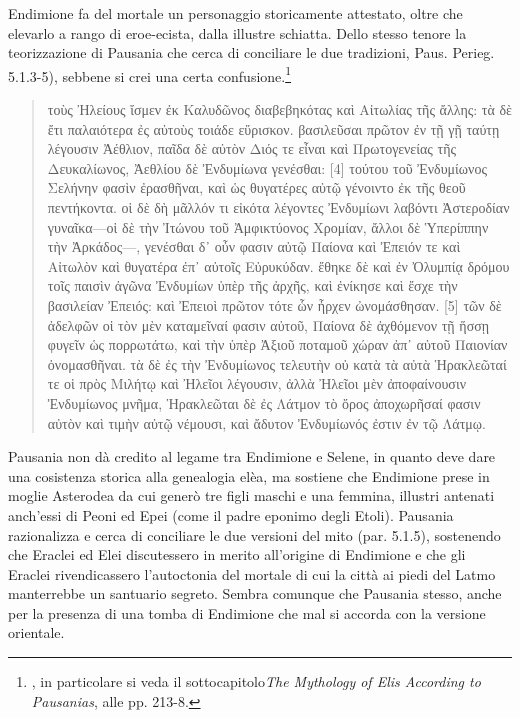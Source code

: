 \documentclass[12pt,a4paper,openright, oneside]{book}
\begin{document}
Endimione fa del mortale un personaggio storicamente attestato, oltre che elevarlo a rango di eroe-ecista, dalla illustre schiatta. Dello stesso tenore la teorizzazione di Pausania che cerca di conciliare le due tradizioni, Paus. Perieg. 5.1.3-5), sebbene si crei una certa confusione.\footnote{\cite{Graf}, in particolare si veda il sottocapitolo\textit{The Mythology of Elis According to Pausanias}, alle pp. 213-8.} 

\begin{quote}\begin{singlespace}\footnotesize{
τοὺς Ἠλείους ἴσμεν ἐκ Καλυδῶνος διαβεβηκότας καὶ Αἰτωλίας τῆς ἄλλης: τὰ δὲ ἔτι παλαιότερα ἐς αὐτοὺς τοιάδε εὕρισκον. βασιλεῦσαι πρῶτον ἐν τῇ γῇ ταύτῃ λέγουσιν Ἀέθλιον, παῖδα δὲ αὐτὸν Διός τε εἶναι καὶ Πρωτογενείας τῆς Δευκαλίωνος, Ἀεθλίου δὲ Ἐνδυμίωνα γενέσθαι: [4] τούτου τοῦ Ἐνδυμίωνος Σελήνην φασὶν ἐρασθῆναι, καὶ ὡς θυγατέρες αὐτῷ γένοιντο ἐκ τῆς θεοῦ πεντήκοντα. οἱ δὲ δὴ μᾶλλόν τι εἰκότα λέγοντες Ἐνδυμίωνι λαβόντι Ἀστεροδίαν γυναῖκα—οἱ δὲ τὴν Ἰτώνου τοῦ Ἀμφικτύονος Χρομίαν, ἄλλοι δὲ Ὑπερίππην τὴν Ἀρκάδος—, γενέσθαι δ᾽ οὖν φασιν αὐτῷ Παίονα καὶ Ἐπειόν τε καὶ Αἰτωλὸν καὶ θυγατέρα ἐπ᾽ αὐτοῖς Εὐρυκύδαν. ἔθηκε δὲ καὶ ἐν Ὀλυμπίᾳ δρόμου τοῖς παισὶν ἀγῶνα Ἐνδυμίων ὑπὲρ τῆς ἀρχῆς, καὶ ἐνίκησε καὶ ἔσχε τὴν βασιλείαν Ἐπειός: καὶ Ἐπειοὶ πρῶτον τότε ὧν ἦρχεν ὠνομάσθησαν. [5] τῶν δὲ ἀδελφῶν οἱ τὸν μὲν καταμεῖναί φασιν αὐτοῦ, Παίονα δὲ ἀχθόμενον τῇ ἥσσῃ φυγεῖν ὡς πορρωτάτω, καὶ τὴν ὑπὲρ Ἀξιοῦ ποταμοῦ χώραν ἀπ᾽ αὐτοῦ Παιονίαν ὀνομασθῆναι. τὰ δὲ ἐς τὴν Ἐνδυμίωνος τελευτὴν οὐ κατὰ τὰ αὐτὰ Ἡρακλεῶταί τε οἱ πρὸς Μιλήτῳ καὶ Ἠλεῖοι λέγουσιν, ἀλλὰ Ἠλεῖοι μὲν ἀποφαίνουσιν Ἐνδυμίωνος μνῆμα, Ἡρακλεῶται δὲ ἐς Λάτμον τὸ ὄρος ἀποχωρῆσαί φασιν αὐτὸν καὶ τιμὴν αὐτῷ νέμουσι, καὶ ἄδυτον Ἐνδυμίωνός ἐστιν ἐν τῷ Λάτμῳ.}\end{singlespace}\nocite{Pausania}
\end{quote}
Pausania non dà credito al legame tra Endimione e Selene, in quanto deve dare una cosistenza storica alla genealogia elèa, ma sostiene che Endimione prese in moglie Asterodea da cui generò tre figli maschi e una femmina, illustri antenati anch'essi di Peoni ed Epei (come il padre eponimo degli Etoli). Pausania razionalizza e cerca di conciliare le due versioni del mito (par. 5.1.5), sostenendo che Eraclei ed Elei discutessero in merito all'origine di Endimione e che gli Eraclei rivendicassero l'autoctonia del mortale di cui la città ai piedi del Latmo manterrebbe un santuario segreto. Sembra comunque che Pausania stesso, anche per la presenza di una tomba di Endimione che mal si accorda con la versione orientale.
\end{document}
